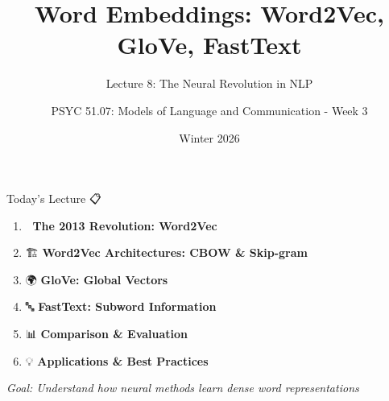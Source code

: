 \documentclass[aspectratio=169]{beamer}
\title{Word Embeddings: Word2Vec, GloVe, FastText}
\subtitle{Lecture 8: The Neural Revolution in NLP}
\author{PSYC 51.07: Models of Language and Communication - Week 3}
\date{Winter 2026}
\begin{document}
\begin{frame}[shrink=10]
\titlepage
\end{frame}

\begin{frame}[shrink=10]{Today's Lecture 📋}
\large
\begin{enumerate}\setlength{\itemsep}{0pt}
    \item 🚀 \textbf{The 2013 Revolution: Word2Vec}
    \item 🏗️ \textbf{Word2Vec Architectures: CBOW \& Skip-gram}
    \item 🌍 \textbf{GloVe: Global Vectors}
    \item 🔤 \textbf{FastText: Subword Information}
    \item 📊 \textbf{Comparison \& Evaluation}
    \item 💡 \textbf{Applications \& Best Practices}
\end{enumerate}

\vspace{1em}
\textit{Goal: Understand how neural methods learn dense word representations}
\end{frame}
\end{document}
